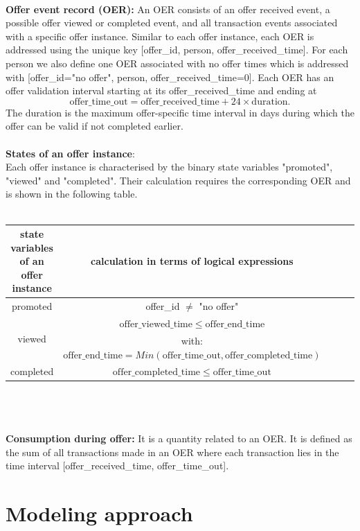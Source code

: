 \documentclass[11pt]{article} %
\begin{document}
\\
\textbf{Offer event record (OER): }An OER consists of an offer received event, a possible offer viewed or completed event, and all transaction events associated with a specific offer instance.
Similar to each offer instance, each OER is addressed using the unique key [offer\_id, person, offer\_received\_time].
For each person we also define one OER associated with no offer times which is addressed with [offer\_id="no offer", person, offer\_received\_time=0].
Each OER has an offer validation interval starting at its offer\_received\_time and ending at $$\mathrm{offer\_time\_out}=\mathrm{offer\_received\_time}+24 \times \mathrm{duration}.$$ 
The duration is the maximum offer-specific time interval in days during which the offer can be valid if not completed earlier.
\\
\\
\textbf{States of an offer instance}: 
\\
Each offer instance is characterised by the binary state variables "promoted", "viewed" and "completed".
Their calculation requires the corresponding OER and is shown in the following table.
\\
\\
\begin{tabular}{|c||c|c|c|c|}
 \hline
\textbf{state variables of an offer instance} & \textbf{calculation in terms of logical expressions} \\ 
\hline
\hline
promoted & offer\_id $\ne$ "no offer"\\ 
\hline
\multirow{ 2}{*}{viewed} &  $\mathrm{offer\_viewed\_time} \le \mathrm{offer\_end\_time}$\\ 
&  with: $ \mathrm{offer\_end\_time}=Min(\mathrm{offer\_time\_out},\mathrm{ offer\_completed\_time})$\\ 
\hline
completed & $\mathrm{ offer\_completed\_time} \le \mathrm{offer\_time\_out} $ \\ 
\hline
\end{tabular}
\\
\\
\\
\textbf{Consumption during offer:}
It is a quantity related to an OER.
It is defined as the sum of all transactions made in an OER where each transaction lies in the time interval [offer\_received\_time, offer\_time\_out].


\section{Modeling approach}
\end{document}
